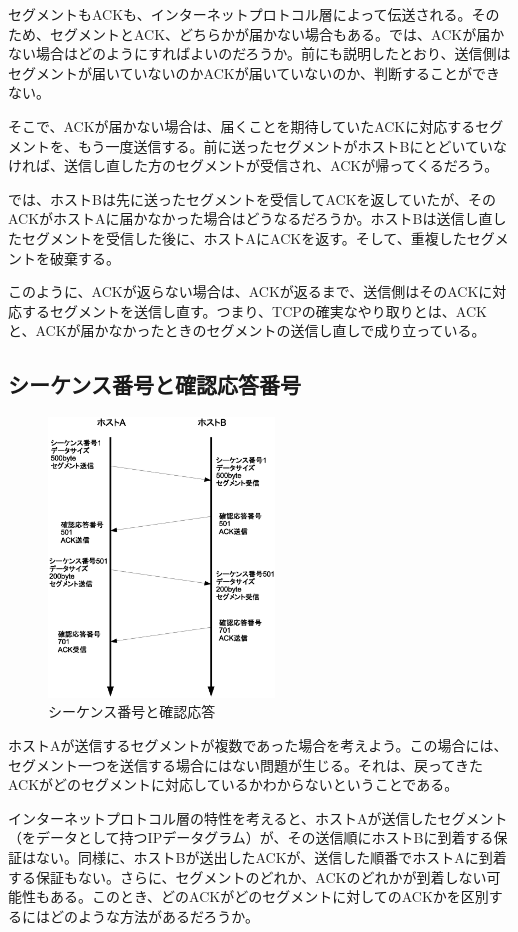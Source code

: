 セグメントもACKも、インターネットプロトコル層によって伝送される。そのため、セグメントとACK、どちらかが届かない場合もある。では、ACKが届かない場合はどのようにすればよいのだろうか。前にも説明したとおり、送信側はセグメントが届いていないのかACKが届いていないのか、判断することができない。

そこで、ACKが届かない場合は、届くことを期待していたACKに対応するセグメントを、もう一度送信する。前に送ったセグメントがホストBにとどいていなければ、送信し直した方のセグメントが受信され、ACKが帰ってくるだろう。

では、ホストBは先に送ったセグメントを受信してACKを返していたが、そのACKがホストAに届かなかった場合はどうなるだろうか。ホストBは送信し直したセグメントを受信した後に、ホストAにACKを返す。そして、重複したセグメントを破棄する。

このように、ACKが返らない場合は、ACKが返るまで、送信側はそのACKに対応するセグメントを送信し直す。つまり、TCPの確実なやり取りとは、ACKと、ACKが届かなかったときのセグメントの送信し直しで成り立っている。

\subsection{シーケンス番号と確認応答番号}
\begin{figure}
	\includegraphics[width=6cm, clip]{draw/tcp02n.eps}
	\caption{シーケンス番号と確認応答}
	\label{fig:tcp02}
\end{figure}

ホストAが送信するセグメントが複数であった場合を考えよう。この場合には、セグメント一つを送信する場合にはない問題が生じる。それは、戻ってきたACKがどのセグメントに対応しているかわからないということである。

インターネットプロトコル層の特性を考えると、ホストAが送信したセグメント（をデータとして持つIPデータグラム）が、その送信順にホストBに到着する保証はない。同様に、ホストBが送出したACKが、送信した順番でホストAに到着する保証もない。さらに、セグメントのどれか、ACKのどれかが到着しない可能性もある。このとき、どのACKがどのセグメントに対してのACKかを区別するにはどのような方法があるだろうか。


